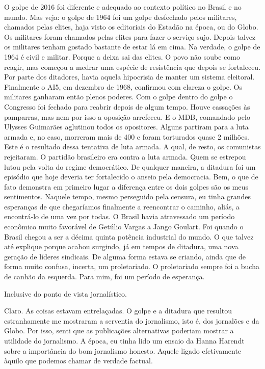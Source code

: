 \falaM O golpe de 2016 foi diferente e adequado ao contexto político no
Brasil e no mundo. Mas veja: o golpe de 1964 foi um golpe desfechado
pelos militares, chamados pelas elites, haja visto os editoriais do
Estadão na época, ou do Globo. Os militares foram chamados pelas elites
para fazer o serviço sujo. Depois talvez os militares tenham gostado
bastante de estar lá em cima. Na verdade, o golpe de 1964 é civil e
militar. Porque a deixa sai das elites. O povo não soube como reagir,
mas começou a medrar uma espécie de resistência que depois se
fortaleceu. Por parte dos ditadores, havia aquela hipocrisia de manter
um sistema eleitoral. Finalmente o AI5, em dezembro de 1968, confirmou
com clareza o golpe. Os militares ganharam então plenos poderes. Com o
golpe dentro do golpe o Congresso foi fechado para reabrir depois de
algum tempo. Houve cassações às pamparras, mas nem por isso a oposição
arrefeceu. E o MDB, comandado pelo Ulysses Guimarães aglutinou todos os
opositores. Alguns partiram para a luta armada e, no caso, morreram mais
de 400 e foram torturados quase 2 milhões. Este é o resultado dessa
tentativa de luta armada. A qual, de resto, os comunistas rejeitaram. O
partidão brasileiro era contra a luta armada. Quem se estrepou lutou
pela volta do regime democrático. De qualquer maneira, a ditadura foi um
episódio que hoje deveria ter fortalecido o anseio pela democracia. Bem,
o que de fato demonstra em primeiro lugar a diferença entre os dois
golpes são os meus sentimentos. Naquele tempo, mesmo perseguido pela
censura, eu tinha grandes esperanças de que chegaríamos finalmente a
reencontrar o caminho, aliás, a encontrá-lo de uma vez por todas. O
Brasil havia atravessado um período econômico muito favorável de Getúlio
Vargas a Jango Goulart. Foi quando o Brasil chegou a ser a décima quinta
potência industrial do mundo. O que talvez até explique porque acabou
surgindo, já em tempos de ditadura, uma nova geração de líderes
sindicais. De alguma forma estava se criando, ainda que de forma muito
confusa, incerta, um proletariado. O proletariado sempre foi a bucha de
canhão da esquerda. Para mim, foi um período de esperança.

\falaG Inclusive do ponto de vista jornalístico.

\falaM Claro. As coisas estavam entrelaçadas. O golpe e a ditadura que
resultou estranhamente me mostraram a serventia do jornalismo, isto é,
dos jornalões e da Globo. Por isso, senti que as publicações
alternativas poderiam mostrar a utilidade do jornalismo. A época, eu
tinha lido um ensaio da Hanna Harendt sobre a importância do bom
jornalismo honesto. Aquele ligado efetivamente àquilo que podemos chamar
de verdade factual.

